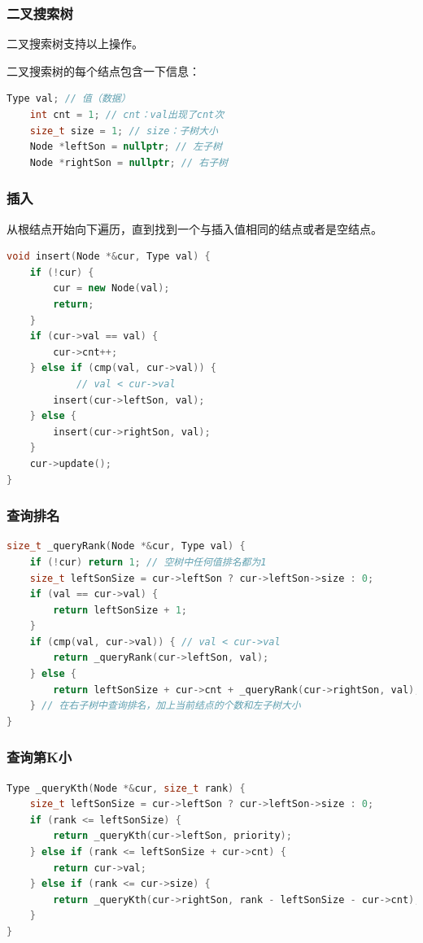 \documentclass[utf8]{ctexbeamer}
\begin{document}
    \begin{frame}[fragile]
        \frametitle{二叉搜索树}
        二叉搜索树支持以上操作。

        二叉搜索树的每个结点包含一下信息：
        \begin{lstlisting}[language=C++]
    Type val; // 值（数据）
    int cnt = 1; // cnt：val出现了cnt次
    size_t size = 1; // size：子树大小
    Node *leftSon = nullptr; // 左子树
    Node *rightSon = nullptr; // 右子树
        \end{lstlisting}
    \end{frame}
    
    \begin{frame}[fragile]
        \frametitle{插入}
        从根结点开始向下遍历，直到找到一个与插入值相同的结点或者是空结点。
        \begin{lstlisting}[language=C++]
void insert(Node *&cur, Type val) {
    if (!cur) {
        cur = new Node(val);
        return;
    }
    if (cur->val == val) {
        cur->cnt++;
    } else if (cmp(val, cur->val)) { 
            // val < cur->val
        insert(cur->leftSon, val);
    } else {
        insert(cur->rightSon, val);
    }
    cur->update();
}
        \end{lstlisting}
    \end{frame}

    \begin{frame}[fragile]
        \frametitle{查询排名}
        \begin{lstlisting}[language=c++]
size_t _queryRank(Node *&cur, Type val) {
    if (!cur) return 1; // 空树中任何值排名都为1
    size_t leftSonSize = cur->leftSon ? cur->leftSon->size : 0;
    if (val == cur->val) {
        return leftSonSize + 1;
    }
    if (cmp(val, cur->val)) { // val < cur->val
        return _queryRank(cur->leftSon, val);
    } else {
        return leftSonSize + cur->cnt + _queryRank(cur->rightSon, val);
    } // 在右子树中查询排名，加上当前结点的个数和左子树大小
}
        \end{lstlisting}
    \end{frame}

    \begin{frame}[fragile]
        \frametitle{查询第K小}
        \begin{lstlisting}[language=c++]
Type _queryKth(Node *&cur, size_t rank) {
    size_t leftSonSize = cur->leftSon ? cur->leftSon->size : 0;
    if (rank <= leftSonSize) {
        return _queryKth(cur->leftSon, priority);
    } else if (rank <= leftSonSize + cur->cnt) {
        return cur->val;
    } else if (rank <= cur->size) {
        return _queryKth(cur->rightSon, rank - leftSonSize - cur->cnt);
    }
}
        \end{lstlisting}       
    
    \end{frame}
\end{document}
